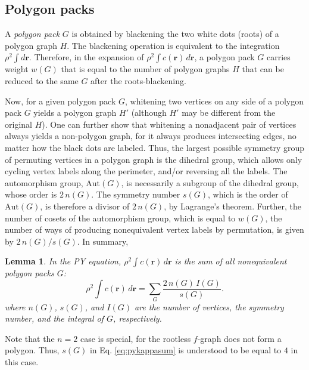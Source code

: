 \documentclass[preprint]{revtex4-1}
\newtheorem{lemm}[thrm]{Lemma}
\newcommand{\vct}[1]{\mathbf{#1}}
\providecommand{\vr}{} %
\renewcommand{\vr}{\vct{r}}
\newcommand{\Aut}{\mathrm{Aut}}
\begin{document}
\subsection{Polygon packs}



A \emph{polygon pack} $G$ is obtained
  by blackening the two white dots (roots) of a polygon graph $H$.
%
The blackening operation is equivalent to the integration $\rho^2 \int d\vr$.
%
Therefore, in the expansion of $\rho^2 \int c(\vr) \, d\vr$,
  a polygon pack $G$ carries weight $w(G)$
  that is equal to the number of polygon graphs $H$ that
  can be reduced to the same $G$ after the roots-blackening.

Now, for a given polygon pack $G$,
  whitening two vertices on any side of
  a polygon pack $G$
  yields a polygon graph $H'$
  (although $H'$ may be different from the original $H$).
%
One can further show that
  whitening a nonadjacent pair of vertices always yields
  a non-polygon graph,
  for it always produces intersecting edges,
  no matter how the black dots are labeled.
%
Thus,
  the largest possible symmetry group of
  permuting vertices in a polygon graph
  is the dihedral group,
  which allows only cycling vertex labels along the perimeter,
  and/or reversing all the labels.
%
The automorphism group, $\Aut(G)$,
  is necessarily a subgroup of the dihedral group,
  whose order is $2 \, n(G)$.
%
The symmetry number $s(G)$,
  which is the order of $\Aut(G)$,
  is therefore a divisor of $2 \, n(G)$,
  by Lagrange's theorem.
%
Further,
  the number of cosets of the automorphism group,
  which is equal to $w(G)$, the number of ways of
  producing nonequivalent vertex labels by permutation,
  is given by $2 \, n(G) / s(G)$.
%
In summary,
\begin{lemm}
In the PY equation,
  $\rho^2 \int c(\vr) \, d\vr$ is the sum of
  all nonequivalent polygon packs $G$:
  \begin{equation}
      \rho^2 \int c(\vr) \, d\vr
    = \sum_{G} \frac{ 2 \, n(G) \, I(G) }{ s(G) }.
  \label{eq:pykappasum}
  \end{equation}
  where $n(G)$, $s(G)$, and $I(G)$ are
  the number of vertices,
  the symmetry number,
  and the integral of $G$,
  respectively.
  \label{thm:pykappasum}
\end{lemm}
%
Note that the $n = 2$ case is special,
  for the rootless $f$-graph does not form a polygon.
Thus, $s(G)$ in Eq. \eqref{eq:pykappasum}
is understood to be equal to $4$ in this case.
\end{document}
